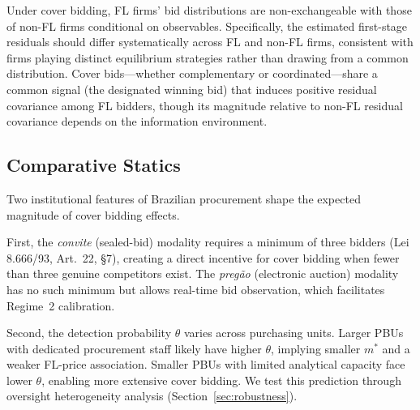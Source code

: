 \begin{prediction} %
\label{pred:independence}
Under cover bidding, FL firms' bid distributions are
non-exchangeable with those of non-FL firms conditional on
observables. Specifically, the estimated first-stage residuals
should differ systematically across FL and non-FL firms, consistent
with firms playing distinct equilibrium strategies rather than
drawing from a common distribution. Cover bids---whether
complementary or coordinated---share a common signal (the
designated winning bid) that induces positive residual covariance
among FL bidders, though its magnitude relative to non-FL residual
covariance depends on the information environment.
\end{prediction}

\subsection{Comparative Statics}

Two institutional features of Brazilian procurement shape the expected
magnitude of cover bidding effects.

First, the \emph{convite} (sealed-bid) modality requires a minimum of
three bidders (Lei 8.666/93, Art.~22, \S7), creating a direct incentive
for cover bidding when fewer than three genuine competitors exist. The
\emph{preg\~ao} (electronic auction) modality has no such minimum but
allows real-time bid observation, which facilitates Regime~2 calibration.

Second, the detection probability $\theta$ varies across purchasing
units. Larger PBUs with dedicated procurement staff likely have higher
$\theta$, implying smaller $m^*$ and a weaker FL-price association.
Smaller PBUs with limited analytical capacity face lower $\theta$,
enabling more extensive cover bidding. We test this prediction through
oversight heterogeneity analysis (Section~\ref{sec:robustness}).
